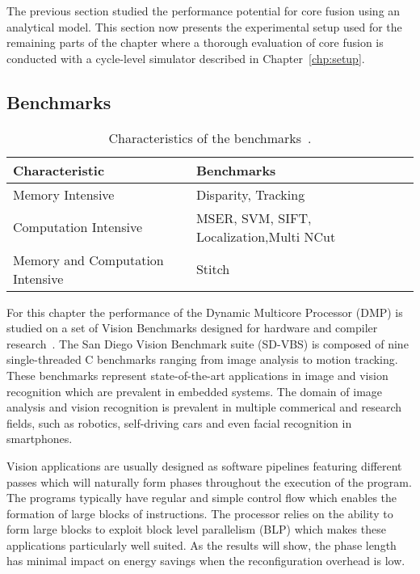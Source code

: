 The previous section studied the performance potential for core fusion using an analytical model.
This section now presents the experimental setup used for the remaining parts of the chapter where a thorough evaluation of core fusion is conducted with a cycle-level simulator described in Chapter~\ref{chp:setup}.

\subsection{Benchmarks}

\begin{table}[t]
  \small
  \centering
 \begin{tabular} { | l | l | }
 \hline
   \cellcolor[gray]{0.7}Characteristic & \cellcolor[gray]{0.7} Benchmarks\\ \hline
    Memory Intensive & Disparity, Tracking\\ \hline
	Computation Intensive & MSER, SVM, SIFT, Localization,Multi NCut\\\hline
	Memory and Computation Intensive & Stitch\\ \hline
   \end{tabular}
  \caption{Characteristics of the benchmarks~\cite{sdvbs}.}\label{tab:sd-vbschar}
\vspace{1em}
  \end{table}

For this chapter the performance of the Dynamic Multicore Processor (DMP) is studied on a set of Vision Benchmarks designed for hardware and compiler research~\cite{sdvbs}.
The San Diego Vision Benchmark suite (SD-VBS) is composed of nine single-threaded C benchmarks ranging from image analysis to motion tracking.
These benchmarks represent state-of-the-art applications in image and vision recognition which are prevalent in embedded systems.
The domain of image analysis and vision recognition is prevalent in multiple commerical and research fields, such as robotics, self-driving cars and even facial recognition in smartphones.

Vision applications are usually designed as software pipelines featuring different passes which will naturally form phases throughout the execution of the program.
The programs typically have regular and simple control flow which enables the formation of large blocks of instructions.
The processor relies on the ability to form large blocks to exploit block level parallelism (BLP) which makes these applications particularly well suited.
As the results will show, the phase length has minimal impact on energy savings when the reconfiguration overhead is low.

